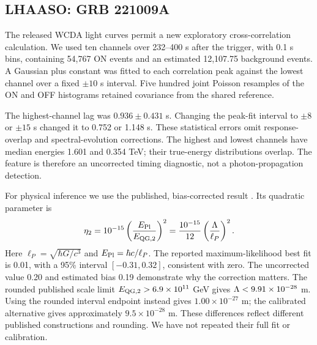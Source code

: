 \documentclass[11pt]{article}
\begin{document}
\subsection{LHAASO: GRB 221009A}
The released WCDA light curves \cite{lhaasodata} permit a new exploratory cross-correlation calculation. We used ten channels over 232--400 s after the trigger, with 0.1 s bins, containing 54,767 ON events and an estimated 12,107.75 background events. A Gaussian plus constant was fitted to each correlation peak against the lowest channel over a fixed $\pm10$ s interval. Five hundred joint Poisson resamples of the ON and OFF histograms retained covariance from the shared reference.

The highest-channel lag was $0.936\pm0.431$ s. Changing the peak-fit interval to $\pm8$ or $\pm15$ s changed it to 0.752 or 1.148 s. These statistical errors omit response-overlap and spectral-evolution corrections. The highest and lowest channels have median energies 1.601 and 0.354 TeV; their true-energy distributions overlap. The feature is therefore an uncorrected timing diagnostic, not a photon-propagation detection.

For physical inference we use the published, bias-corrected result \cite{lhaaso}. Its quadratic parameter is
\begin{equation}
 \eta_2=10^{-15}\left(\frac{E_{\rm Pl}}{E_{\rm QG,2}}\right)^2
       =\frac{10^{-15}}{12}\left(\frac{\Lambda}{\ell_P}\right)^2.
\end{equation}
Here $\ell_P=\sqrt{\hbar G/c^3}$ and $E_{\rm Pl}=\hbar c/\ell_P$. The reported maximum-likelihood best fit is 0.01, with a 95\% interval $[-0.31,0.32]$, consistent with zero. The uncorrected value 0.20 and estimated bias 0.19 demonstrate why the correction matters. The rounded published scale limit $E_{\rm QG,2}>6.9\times10^{11}$ GeV gives $\Lambda<9.91\times10^{-28}$ m. Using the rounded interval endpoint instead gives $1.00\times10^{-27}$ m; the calibrated alternative gives approximately $9.5\times10^{-28}$ m. These differences reflect different published constructions and rounding. We have not repeated their full fit or calibration.

\newpage
\end{document}
